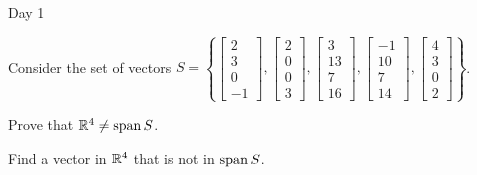 \begin{applicationActivities}{Day 1}
\begin{activity}{15}
  Consider the set of vectors \(S=\left\{
  \begin{bmatrix}2\\3\\0\\-1\end{bmatrix},
  \begin{bmatrix}2\\0\\0\\3\end{bmatrix},
  \begin{bmatrix}3\\13\\7\\16\end{bmatrix},
  \begin{bmatrix}-1\\10\\7\\14\end{bmatrix},
  \begin{bmatrix}4\\3\\0\\2\end{bmatrix}
  \right\}
  \).
  \begin{subactivity}
  Prove that
  \(\mathbb{R}^4\not=\operatorname{span} S\).
  \end{subactivity}
  \begin{subactivity}
  Find a vector in \(\mathbb{R}^4\) that is not in \(\operatorname{span} S\).
  \end{subactivity}
\end{activity}



\end{applicationActivities}
